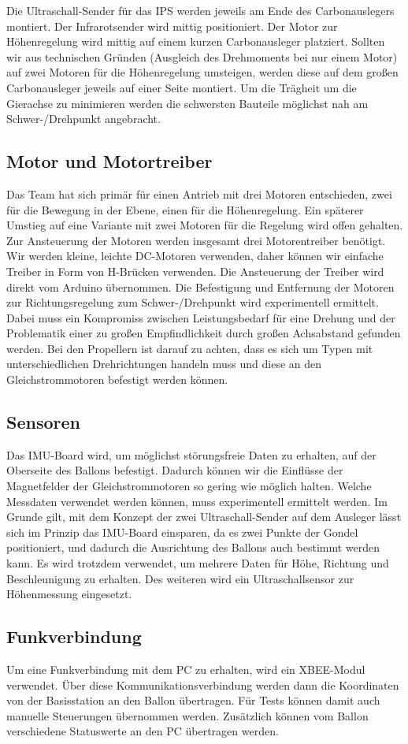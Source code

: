 \documentclass[lang=ngerman,inputenc=utf8,fontsize=10pt]{ldvarticle}
\begin{document}
Die Ultraschall-Sender für das IPS werden jeweils am Ende des Carbonauslegers montiert. Der Infrarotsender wird mittig positioniert. Der Motor zur Höhenregelung wird mittig auf einem kurzen Carbonausleger platziert. Sollten wir aus technischen Gründen (Ausgleich des Drehmoments bei nur einem Motor) auf zwei Motoren für die Höhenregelung umsteigen, werden diese auf dem großen Carbonausleger jeweils auf einer Seite montiert. Um die Trägheit um die Gierachse zu minimieren werden die schwersten Bauteile möglichst nah am Schwer-/Drehpunkt angebracht.
\subsection*{Motor und Motortreiber}
Das Team hat sich primär für einen Antrieb mit drei Motoren entschieden, zwei für die Bewegung in der Ebene, einen für die Höhenregelung. Ein späterer Umstieg auf eine Variante mit zwei Motoren für die Regelung wird offen gehalten. Zur Ansteuerung der Motoren werden insgesamt drei Motorentreiber benötigt. Wir werden kleine, leichte DC-Motoren verwenden, daher können wir einfache Treiber in Form von H-Brücken verwenden. Die Ansteuerung der Treiber wird direkt vom Arduino übernommen. Die Befestigung und Entfernung der Motoren zur Richtungsregelung zum Schwer-/Drehpunkt wird experimentell ermittelt. Dabei muss ein Kompromiss zwischen Leistungsbedarf für eine Drehung und der Problematik einer zu großen Empfindlichkeit durch großen Achsabstand gefunden werden. Bei den Propellern ist darauf zu achten, dass es sich um Typen mit unterschiedlichen Drehrichtungen handeln muss und diese an den Gleichstrommotoren befestigt werden können.
\subsection*{Sensoren}
Das IMU-Board wird, um möglichst störungsfreie Daten zu erhalten, auf der Oberseite des Ballons befestigt. Dadurch können wir die Einflüsse der Magnetfelder der Gleichstrommotoren so gering wie möglich halten. Welche Messdaten verwendet werden können, muss experimentell ermittelt werden. Im Grunde gilt, mit dem Konzept der zwei Ultraschall-Sender auf dem Ausleger lässt sich im Prinzip das IMU-Board einsparen, da es zwei Punkte der Gondel positioniert, und dadurch die Ausrichtung des Ballons auch bestimmt werden kann. Es wird trotzdem verwendet, um mehrere Daten für Höhe, Richtung und Beschleunigung zu erhalten. Des weiteren wird ein Ultraschallsensor zur Höhenmessung eingesetzt.
\subsection*{Funkverbindung}
Um eine Funkverbindung mit dem PC zu erhalten, wird ein XBEE-Modul verwendet. Über diese Kommunikationsverbindung werden dann die Koordinaten von der Basisstation an den Ballon übertragen. Für Tests können damit auch manuelle Steuerungen übernommen werden. Zusätzlich können vom Ballon verschiedene Statuswerte an den PC übertragen werden.
\end{document}
